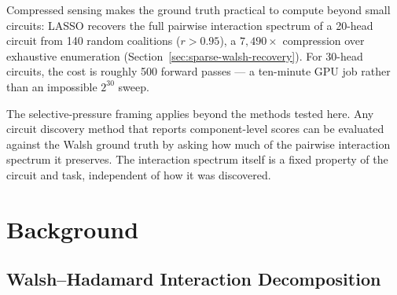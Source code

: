 \documentclass{article}
\begin{document}
Compressed sensing makes the ground truth practical to compute beyond
small circuits: LASSO recovers the full pairwise interaction spectrum of
a 20-head circuit from 140 random coalitions ($r > 0.95$), a
$7{,}490\times$ compression over exhaustive enumeration
(Section~\ref{sec:sparse-walsh-recovery}). For 30-head circuits, the
cost is roughly 500 forward passes --- a ten-minute GPU job rather than
an impossible $2^{30}$ sweep.

The selective-pressure framing applies beyond the methods tested here.
Any circuit discovery method that reports component-level scores can be
evaluated against the Walsh ground truth by asking how much of the
pairwise interaction spectrum it preserves. The interaction spectrum
itself is a fixed property of the circuit and task, independent of
how it was discovered.



%

\section{Background}
\label{sec:background}

\subsection{Walsh--Hadamard Interaction Decomposition}
\label{sec:walsh-decomposition}
\end{document}
